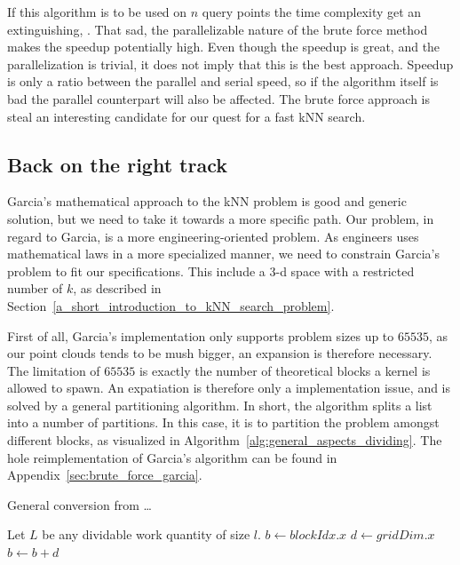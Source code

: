 If this algorithm is to be used on $n$ query points the time complexity get an extinguishing, . That sad, the parallelizable nature of the brute force method makes the speedup potentially high. Even though the speedup is great, and the parallelization is trivial, it does not imply that this is the best approach. Speedup is only a ratio between the parallel and serial speed, so if the algorithm itself is bad the parallel counterpart will also be affected. The brute force approach is steal an interesting candidate for our quest for a fast kNN search.


\subsection{Back on the right track} %
\label{sub:back_on_the_right_rrack}


Garcia's mathematical approach to the kNN problem is good and generic solution, but we need to take it towards a more specific path. Our problem, in regard to Garcia, is a more engineering-oriented problem. As engineers uses mathematical laws in a more specialized manner, we need to constrain Garcia's problem to fit our specifications. This include a 3-d space with a restricted number of $k$, as described in Section~\ref{a_short_introduction_to_kNN_search_problem}.



First of all, Garcia's implementation only supports problem sizes up to $65535$, as our point clouds tends to be mush bigger, an expansion is therefore necessary. The limitation of $65535$ is exactly the number of theoretical blocks a kernel is allowed to spawn. An expatiation is therefore only a implementation issue, and is solved by a general partitioning algorithm. In short, the algorithm splits a list into a number of partitions. In this case, it is to partition the problem amongst different blocks, as visualized in Algorithm~\ref{alg:general_aspects_dividing}. The hole reimplementation of Garcia's algorithm can be found in Appendix~\ref{sec:brute_force_garcia}.

\begin{algorithm}[ht]
\caption{General conversion from \dots}
\label{alg:general_aspects_dividing}
\begin{algorithmic}
\State Let $L$ be any dividable work quantity of size $l$.
    \State $b \gets blockIdx.x$ 
    \State $d \gets gridDim.x$ 
    \State {}
    \State $b \gets b + d$
    \EndWhile
    \EndFunction
\end{algorithmic}
\end{algorithm}


